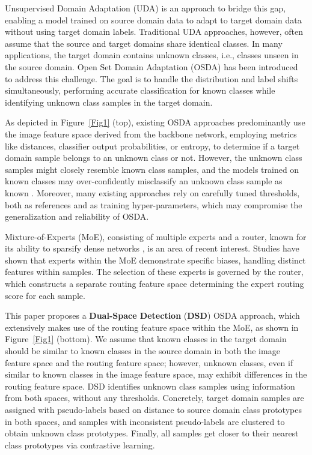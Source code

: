 \documentclass[10pt,twocolumn,letterpaper]{article}
\begin{document}
Unsupervised Domain Adaptation (UDA) \cite{ganin2015unsupervised, long2015learning} is an approach to bridge this gap, enabling a model trained on source domain data to adapt to target domain data without using target domain labels. Traditional UDA approaches, however, often assume that the source and target domains share identical classes. In many applications, the target domain contains unknown classes, i.e., classes unseen in the source domain. Open Set Domain Adaptation (OSDA) \cite{GHAFFARI2023101912, saito2018open, liu2019separate, bucci2020effectiveness, luo2020progressive, jang2022unknown, li2023adjustment} has been introduced to address this challenge. The goal is to handle the distribution and label shifts simultaneously, performing accurate classification for known classes while identifying unknown class samples in the target domain.

As depicted in Figure~\ref{Fig1} (top), existing OSDA approaches predominantly use the image feature space derived from the backbone network, employing metrics like distances, classifier output probabilities, or entropy, to determine if a target domain sample belongs to an unknown class or not. However, the unknown class samples might closely resemble known class samples, and the models trained on known classes may over-confidently misclassify an unknown class sample as known \cite{hendrycks2017a,dhamija2018reducing, li2023robustness}. Moreover, many existing approaches \cite{li2023adjustment, sanqing2023GLC} rely on carefully tuned thresholds, both as references and as training hyper-parameters, which may compromise the generalization and reliability of OSDA.

Mixture-of-Experts (MoE), consisting of multiple experts and a router, known for its ability to sparsify dense networks \cite{riquelme2021scaling, fedus2022review}, is an area of recent interest. Studies \cite{mustafa2022multimodal, li2023sparse} have shown that experts within the MoE demonstrate specific biases, handling distinct features within samples. The selection of these experts is governed by the router, which constructs a separate routing feature space determining the expert routing score for each sample.

This paper proposes a \textbf{Dual-Space Detection} (\textbf{DSD}) OSDA approach, which extensively makes use of the routing feature space within the MoE, as shown in Figure~\ref{Fig1} (bottom). We assume that known classes in the target domain should be similar to known classes in the source domain in both the image feature space and the routing feature space; however, unknown classes, even if similar to known classes in the image feature space, may exhibit differences in the routing feature space. DSD identifies unknown class samples using information from both spaces, without any thresholds. Concretely, target domain samples are assigned with pseudo-labels based on distance to source domain class prototypes in both spaces, and samples with inconsistent pseudo-labels are clustered to obtain unknown class prototypes. Finally, all samples get closer to their nearest class prototypes via contrastive learning.
\end{document}
